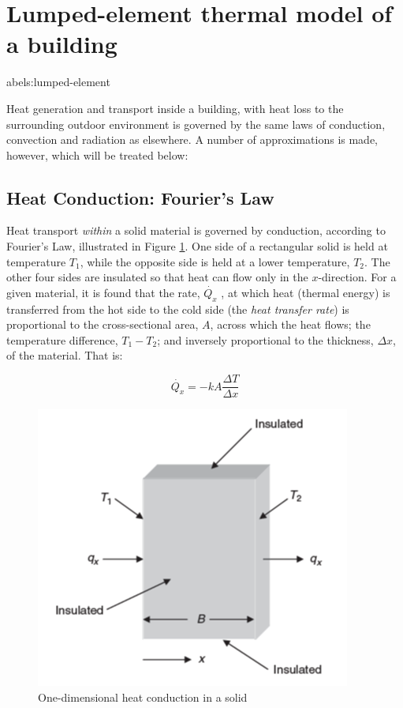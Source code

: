 \section{Lumped-element thermal model of a building}\;abel{s:lumped-element}

Heat generation and transport inside a building, with heat loss to the surrounding outdoor environment is governed by the same laws of conduction, convection and radiation as elsewhere. A number of approximations is made, however, which will be treated below:

\subsection{Heat Conduction: Fourier's Law}

Heat transport \emph{within} a solid material is governed by conduction, according to Fourier's Law, illustrated in Figure \ref{fig:heatcond_1d}.
One side of a rectangular solid is held at temperature $T_1$, while the opposite side is held at a lower temperature, $T_2$. The other four sides are insulated so that heat can flow only in the $x$-direction. For a given material, it is found that the rate, $\dot{Q_x}$ , at which heat (thermal
energy) is transferred from the hot side to the cold side (the \emph{heat transfer rate}) is proportional to the cross-sectional area, $A$, across which the heat flows; the temperature difference, $T_1 - T_2$; and inversely proportional to
the thickness, $\Delta x$, of the material. That is:

\begin{equation}
	\label{eq:fourierlaw}
	\dot{Q_x} = - kA \frac{\Delta T}{\Delta x}
\end{equation}

\begin{figure}[H]
	\centering
	\includegraphics[width=0.5\columnwidth]{Pictures/heat_conduction_1d.png}
	\caption[Short title]{One-dimensional heat conduction in a solid}
	\label{fig:heatcond_1d}
\end{figure} 


